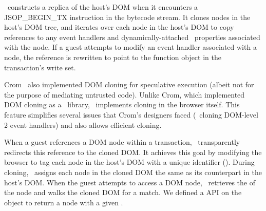\txjs\ constructs a replica of the host's DOM when it encounters a
\textsf{JSOP\_BEGIN\_TX} instruction in the bytecode stream. It clones nodes in
the host's DOM tree, and iterates over each node in the host's DOM to copy
references to any event handlers and dynamically-attached \js\ properties
associated with the node. If a guest attempts to modify an event handler
associated with a node, the reference is rewritten to point to the function
object in the transaction's write set.

Crom~\cite{crom:nsdi10} also implemented DOM cloning for speculative
execution (albeit not for the purpose of mediating untrusted code).  Unlike
Crom, which implemented DOM cloning as a \js\ library, \txjs\ implements
cloning in the browser itself. This feature simplifies several issues that
Crom's designers faced (\eg~cloning DOM-level 2 event handlers) and also allows
efficient cloning.

When a guest references a DOM node within a transaction, \txjs\ transparently
redirects this reference to the cloned DOM. It achieves this goal by modifying
the browser to tag each node in the host's DOM with a unique identifier
(). During cloning, \txjs\ assigns each node in the cloned DOM the
same  as its counterpart in the host's DOM.  When the guest attempts
to access a DOM node, \txjs\ retrieves the  of the node and walks the
cloned DOM for a match. We defined a  API on the
 object to return a node with a given . 


